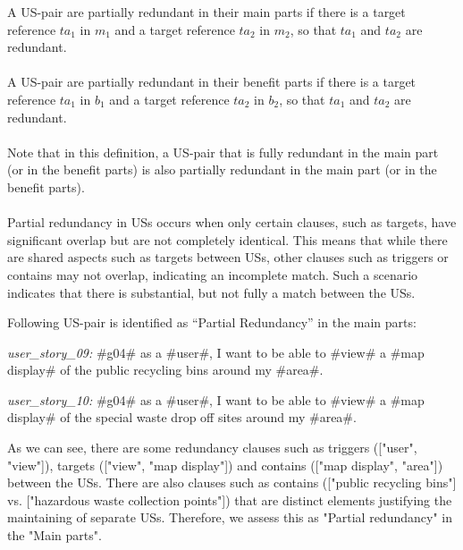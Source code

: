 \begin{definition}
	A US-pair are partially redundant in their main parts if there is a target reference $ta_1$ in $m_1$ and a target reference $ta_2$ in $m_2$, so that $ta_1$ and $ta_2$ are redundant.\\\\
	A US-pair are partially redundant in their benefit parts if there is a target reference $ta_1$ in $b_1$ and a target reference $ta_2$ in $b_2$, so that $ta_1$ and $ta_2$ are redundant.\\\\
	Note that in this definition, a US-pair that is fully redundant in the main part (or in the benefit parts) is also partially redundant in the main part (or in the benefit parts).\\\\
	Partial redundancy in USs occurs when only certain clauses, such as targets, have significant overlap but are not completely identical. This means that while there are shared aspects such as targets between USs, other clauses such as triggers or contains may not overlap, indicating an incomplete match. Such a scenario indicates that there is substantial, but not fully a match between the USs.
\end{definition}
\begin{example}
	Following US-pair is identified as \enquote{Partial Redundancy} in the main parts:
	
	\textit{user\_story\_09:} \#g04\# as a \#user\#, I want to be able to \#view\# a \#map display\# of the public recycling bins around my \#area\#.
	
	\textit{user\_story\_10:} \#g04\# as a \#user\#, I want to be able to \#view\# a \#map display\# of the special waste drop off sites around my \#area\#.
	
	As we can see, there are some redundancy clauses such as triggers (["user", "view"]), targets (["view", "map display"]) and contains (["map display", "area"]) between the USs. There are also clauses such as contains (["public recycling bins"] vs. ["hazardous waste collection points"]) that are distinct elements justifying the maintaining of separate USs. Therefore, we assess this as "Partial redundancy" in the "Main parts".
\end{example}
